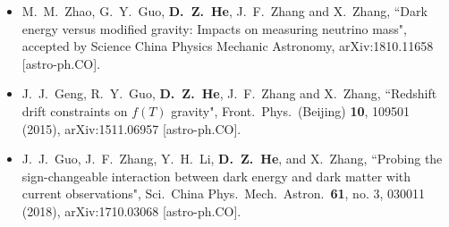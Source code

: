 \begin{itemize}[leftmargin=*]
    \item  M.~M.~Zhao, G.~Y.~Guo, \textbf{D.~Z.~He}, J.~F.~Zhang and X.~Zhang, ``Dark energy versus modified gravity: Impacts on measuring neutrino mass", accepted by Science China Physics Mechanic Astronomy, arXiv:1810.11658 [astro-ph.CO].
 
    \item J.~J.~Geng, R.~Y.~Guo, \textbf{D.~Z.~He}, J.~F.~Zhang and X.~Zhang, ``Redshift drift constraints on $f(T)$ gravity", Front.\ Phys.\ (Beijing) {\bf 10}, 109501      (2015), arXiv:1511.06957 [astro-ph.CO].
  
    \item J.~J.~Guo, J.~F.~Zhang, Y.~H.~Li, \textbf{D.~Z.~He}, and X.~Zhang, ``Probing the sign-changeable interaction between dark energy and dark matter with current observations", Sci.\ China Phys.\ Mech.\ Astron.\ {\bf 61}, no. 3, 030011 (2018), arXiv:1710.03068 [astro-ph.CO].
    
  \end{itemize}